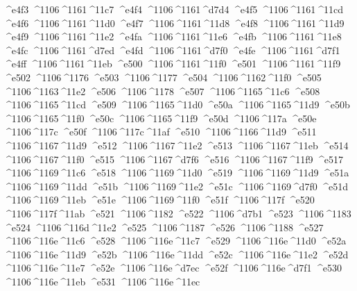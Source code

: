\checkit ^^^^e4f3 ^^^^1106^^^^1161^^^^11c7
\checkit ^^^^e4f4 ^^^^1106^^^^1161^^^^d7d4
\checkit ^^^^e4f5 ^^^^1106^^^^1161^^^^11cd
\checkit ^^^^e4f6 ^^^^1106^^^^1161^^^^11d0
\checkit ^^^^e4f7 ^^^^1106^^^^1161^^^^11d8
\checkit ^^^^e4f8 ^^^^1106^^^^1161^^^^11d9
\checkit ^^^^e4f9 ^^^^1106^^^^1161^^^^11e2
\checkit ^^^^e4fa ^^^^1106^^^^1161^^^^11e6
\checkit ^^^^e4fb ^^^^1106^^^^1161^^^^11e8
\checkit ^^^^e4fc ^^^^1106^^^^1161^^^^d7ed
\checkit ^^^^e4fd ^^^^1106^^^^1161^^^^d7f0
\checkit ^^^^e4fe ^^^^1106^^^^1161^^^^d7f1
\checkit ^^^^e4ff ^^^^1106^^^^1161^^^^11eb
\checkit ^^^^e500 ^^^^1106^^^^1161^^^^11f0
\checkit ^^^^e501 ^^^^1106^^^^1161^^^^11f9
\checkit ^^^^e502 ^^^^1106^^^^1176
\checkit ^^^^e503 ^^^^1106^^^^1177
\checkit ^^^^e504 ^^^^1106^^^^1162^^^^11f0
\checkit ^^^^e505 ^^^^1106^^^^1163^^^^11e2
\checkit ^^^^e506 ^^^^1106^^^^1178
\checkit ^^^^e507 ^^^^1106^^^^1165^^^^11c6
\checkit ^^^^e508 ^^^^1106^^^^1165^^^^11cd
\checkit ^^^^e509 ^^^^1106^^^^1165^^^^11d0
\checkit ^^^^e50a ^^^^1106^^^^1165^^^^11d9
\checkit ^^^^e50b ^^^^1106^^^^1165^^^^11f0
\checkit ^^^^e50c ^^^^1106^^^^1165^^^^11f9
\checkit ^^^^e50d ^^^^1106^^^^117a
\checkit ^^^^e50e ^^^^1106^^^^117c
\checkit ^^^^e50f ^^^^1106^^^^117c^^^^11af
\checkit ^^^^e510 ^^^^1106^^^^1166^^^^11d9
\checkit ^^^^e511 ^^^^1106^^^^1167^^^^11d9
\checkit ^^^^e512 ^^^^1106^^^^1167^^^^11e2
\checkit ^^^^e513 ^^^^1106^^^^1167^^^^11eb
\checkit ^^^^e514 ^^^^1106^^^^1167^^^^11f0
\checkit ^^^^e515 ^^^^1106^^^^1167^^^^d7f6
\checkit ^^^^e516 ^^^^1106^^^^1167^^^^11f9
\checkit ^^^^e517 ^^^^1106^^^^1169^^^^11c6
\checkit ^^^^e518 ^^^^1106^^^^1169^^^^11d0
\checkit ^^^^e519 ^^^^1106^^^^1169^^^^11d9
\checkit ^^^^e51a ^^^^1106^^^^1169^^^^11dd
\checkit ^^^^e51b ^^^^1106^^^^1169^^^^11e2
\checkit ^^^^e51c ^^^^1106^^^^1169^^^^d7f0
\checkit ^^^^e51d ^^^^1106^^^^1169^^^^11eb
\checkit ^^^^e51e ^^^^1106^^^^1169^^^^11f0
\checkit ^^^^e51f ^^^^1106^^^^117f
\checkit ^^^^e520 ^^^^1106^^^^117f^^^^11ab
\checkit ^^^^e521 ^^^^1106^^^^1182
\checkit ^^^^e522 ^^^^1106^^^^d7b1
\checkit ^^^^e523 ^^^^1106^^^^1183
\checkit ^^^^e524 ^^^^1106^^^^116d^^^^11e2
\checkit ^^^^e525 ^^^^1106^^^^1187
\checkit ^^^^e526 ^^^^1106^^^^1188
\checkit ^^^^e527 ^^^^1106^^^^116e^^^^11c6
\checkit ^^^^e528 ^^^^1106^^^^116e^^^^11c7
\checkit ^^^^e529 ^^^^1106^^^^116e^^^^11d0
\checkit ^^^^e52a ^^^^1106^^^^116e^^^^11d9
\checkit ^^^^e52b ^^^^1106^^^^116e^^^^11dd
\checkit ^^^^e52c ^^^^1106^^^^116e^^^^11e2
\checkit ^^^^e52d ^^^^1106^^^^116e^^^^11e7
\checkit ^^^^e52e ^^^^1106^^^^116e^^^^d7ec
\checkit ^^^^e52f ^^^^1106^^^^116e^^^^d7f1
\checkit ^^^^e530 ^^^^1106^^^^116e^^^^11eb
\checkit ^^^^e531 ^^^^1106^^^^116e^^^^11ec
